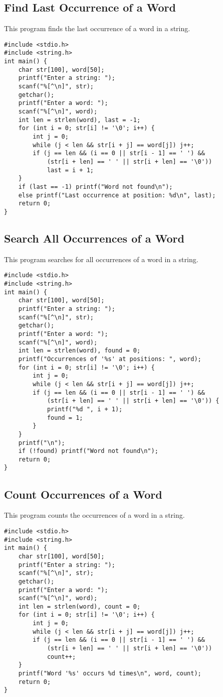 \documentclass[a4paper,12pt]{article}
\begin{document}
\subsection{Find Last Occurrence of a Word}
This program finds the last occurrence of a word in a string.
\begin{lstlisting}[caption={Find Last Occurrence of a Word}]
#include <stdio.h>
#include <string.h>
int main() {
    char str[100], word[50];
    printf("Enter a string: ");
    scanf("%[^\n]", str);
    getchar();
    printf("Enter a word: ");
    scanf("%[^\n]", word);
    int len = strlen(word), last = -1;
    for (int i = 0; str[i] != '\0'; i++) {
        int j = 0;
        while (j < len && str[i + j] == word[j]) j++;
        if (j == len && (i == 0 || str[i - 1] == ' ') && 
            (str[i + len] == ' ' || str[i + len] == '\0'))
            last = i + 1;
    }
    if (last == -1) printf("Word not found\n");
    else printf("Last occurrence at position: %d\n", last);
    return 0;
}
\end{lstlisting}
\clearpage

\subsection{Search All Occurrences of a Word}
This program searches for all occurrences of a word in a string.
\begin{lstlisting}[caption={Search All Occurrences of a Word}]
#include <stdio.h>
#include <string.h>
int main() {
    char str[100], word[50];
    printf("Enter a string: ");
    scanf("%[^\n]", str);
    getchar();
    printf("Enter a word: ");
    scanf("%[^\n]", word);
    int len = strlen(word), found = 0;
    printf("Occurrences of '%s' at positions: ", word);
    for (int i = 0; str[i] != '\0'; i++) {
        int j = 0;
        while (j < len && str[i + j] == word[j]) j++;
        if (j == len && (i == 0 || str[i - 1] == ' ') && 
            (str[i + len] == ' ' || str[i + len] == '\0')) {
            printf("%d ", i + 1);
            found = 1;
        }
    }
    printf("\n");
    if (!found) printf("Word not found\n");
    return 0;
}
\end{lstlisting}
\clearpage

\subsection{Count Occurrences of a Word}
This program counts the occurrences of a word in a string.
\begin{lstlisting}[caption={Count Occurrences of a Word}]
#include <stdio.h>
#include <string.h>
int main() {
    char str[100], word[50];
    printf("Enter a string: ");
    scanf("%[^\n]", str);
    getchar();
    printf("Enter a word: ");
    scanf("%[^\n]", word);
    int len = strlen(word), count = 0;
    for (int i = 0; str[i] != '\0'; i++) {
        int j = 0;
        while (j < len && str[i + j] == word[j]) j++;
        if (j == len && (i == 0 || str[i - 1] == ' ') && 
            (str[i + len] == ' ' || str[i + len] == '\0'))
            count++;
    }
    printf("Word '%s' occurs %d times\n", word, count);
    return 0;
}
\end{lstlisting}
\clearpage
\end{document}
